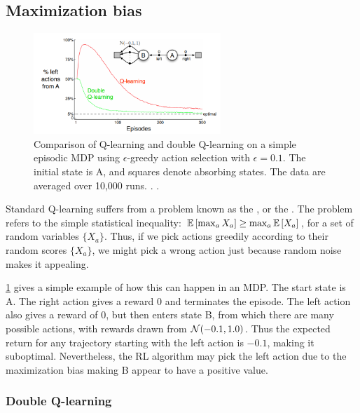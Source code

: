\subsection{Maximization bias}

\begin{figure}
\centering
\includegraphics[height=1.5in]{figs/sutton-6-5}
\caption{
  Comparison of Q-learning and double Q-learning on a simple episodic
  MDP using $\epsilon$-greedy action selection with $\epsilon=0.1$.
  The initial state is A, and squares denote absorbing states.
The data are averaged over 10,000 runs.
.
.
}
\label{fig:sutton-6-5}
\end{figure}

Standard Q-learning suffers from a problem
known as the  \citep{Smith2006},
or the .
The problem refers to the simple statistical inequality:
$\mathbb{E}\left[{\max_a X_a}\right] \geq \max_a \mathbb{E}\left[{X_a}\right]$,
for a set of random variables $\{X_a\}$.
Thus, if we pick actions greedily according to their random scores $\{X_a\}$, we might pick a wrong action just because random noise makes it appealing.

\cref{fig:sutton-6-5} gives a simple example
of how this can happen in an MDP.
The start state is A.
The right action gives a reward 0 and terminates the episode.
The left action also gives a reward of 0,
but then enters state B,
from which there are many possible actions,
with rewards drawn from $\mathcal{N}(-0.1, 1.0)$.
Thus the expected return for any trajectory starting with the left
action is $-0.1$, making it suboptimal.
Nevertheless, the RL algorithm may pick   the left action
due to the maximization bias making B appear to have a positive value.

\subsubsection{Double Q-learning}
\label{sec:double}

